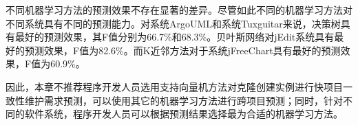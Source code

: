 不同机器学习方法的预测效果不存在显著的差异。尽管如此不同的机器学习方法对不同系统具有不同的预测能力。对系统ArgoUML和系统Tuxguitar来说，决策树具有最好的预测效果，其F值分别为66.7\%和68.3\%。贝叶斯网络对jEdit系统具有最好的预测效果，F值为82.6\%。而K近邻方法对于系统jFreeChart具有最好的预测效果，F值为60.9\%。

因此，本章不推荐程序开发人员选用支持向量机方法对克隆创建实例进行快项目一致性维护需求预测，可以使用其它的机器学习方法进行跨项目预测；同时，针对不同的软件系统，程序开发人员可以根据预测结果选择最为合适的机器学习方法。

